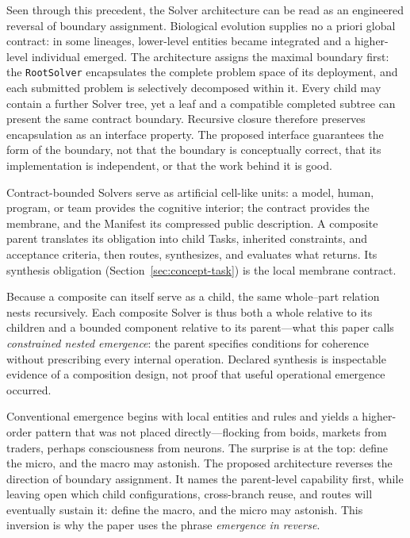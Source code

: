 \documentclass[11pt]{article}
\let\oldtexttt\texttt
\renewcommand{\texttt}[1]{\oldtexttt{\small #1}}
\begin{document}
Seen through this precedent, the Solver architecture can be read as an engineered reversal of boundary assignment. Biological evolution supplies no a priori global contract: in some lineages, lower-level entities became integrated and a higher-level individual emerged. The architecture assigns the maximal boundary first: the \texttt{RootSolver} encapsulates the complete problem space of its deployment, and each submitted problem is selectively decomposed within it. Every child may contain a further Solver tree, yet a leaf and a compatible completed subtree can present the same contract boundary. Recursive closure therefore preserves encapsulation as an interface property. The proposed interface guarantees the form of the boundary, not that the boundary is conceptually correct, that its implementation is independent, or that the work behind it is good.

Contract-bounded Solvers serve as artificial cell-like units: a model, human, program, or team provides the cognitive interior; the contract provides the membrane, and the Manifest its compressed public description. A composite parent translates its obligation into child Tasks, inherited constraints, and acceptance criteria, then routes, synthesizes, and evaluates what returns. Its synthesis obligation (Section~\ref{sec:concept-task}) is the local membrane contract.

Because a composite can itself serve as a child, the same whole--part relation nests recursively. Each composite Solver is thus both a whole relative to its children and a bounded component relative to its parent---what this paper calls \emph{constrained nested emergence}: the parent specifies conditions for coherence without prescribing every internal operation. Declared synthesis is inspectable evidence of a composition design, not proof that useful operational emergence occurred.

Conventional emergence begins with local entities and rules and yields a higher-order pattern that was not placed directly---flocking from boids, markets from traders, perhaps consciousness from neurons. The surprise is at the top: define the micro, and the macro may astonish. The proposed architecture reverses the direction of boundary assignment. It names the parent-level capability first, while leaving open which child configurations, cross-branch reuse, and routes will eventually sustain it: define the macro, and the micro may astonish. This inversion is why the paper uses the phrase \emph{emergence in reverse}.
\end{document}
